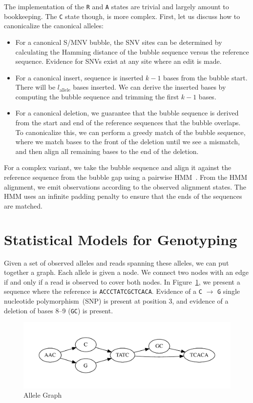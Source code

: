 \documentclass[masters]{ucbthesis}
\begin{document}
The implementation of the \texttt{R} and \texttt{A} states are trivial and largely amount to bookkeeping.
The \texttt{C} state though, is more complex. First, let us discuss how to canonicalize the canonical
alleles:

\begin{itemize}
\item For a canonical S/MNV bubble, the SNV sites can be determined by calculating the Hamming distance
of the bubble sequence versus the reference sequence. Evidence for SNVs exist at any site
where an edit is made.
\item For a canonical insert, sequence is inserted $k - 1$ bases from the bubble start. There will be
$l_{\text{allele}}$ bases inserted. We can derive the inserted bases by computing the bubble
sequence and trimming the first $k - 1$ bases.
\item For a canonical deletion, we guarantee that the bubble sequence is derived from the start and
end of the reference sequences that the bubble overlaps. To canonicalize this, we can perform
a greedy match of the bubble sequence, where we match bases to the front of the deletion until
we see a mismatch, and then align all remaining bases to the end of the deletion.
\end{itemize}

For a complex variant, we take the bubble sequence and align it against the reference sequence
from the bubble gap using a pairwise HMM~\cite{durbin98}. From the HMM alignment, we
emit observations according to the observed alignment states. The HMM uses an infinite padding
penalty to ensure that the ends of the sequences are matched.

\section{Statistical Models for Genotyping}
\label{sec:statistical-genotyping}

Given a set of observed alleles and reads spanning these alleles, we can put together a graph. Each
allele is given a node. We connect two nodes with an edge if and only if a read is observed to cover both
nodes. In Figure~\ref{fig:alleles}, we present a sequence where the reference is
\texttt{ACCCTATCGCTCACA}. Evidence of a \texttt{C} $\rightarrow$ \texttt{G} single nucleotide
polymorphism~(SNP) is present at position 3, and evidence of a deletion of bases 8--9 (\texttt{GC}) is
present.

\begin{figure}[h]
\begin{center}
\includegraphics[width=0.4\linewidth]{graphs/alleles.pdf}
\end{center}
\caption{Allele Graph}
\label{fig:alleles}
\end{figure}
\end{document}
